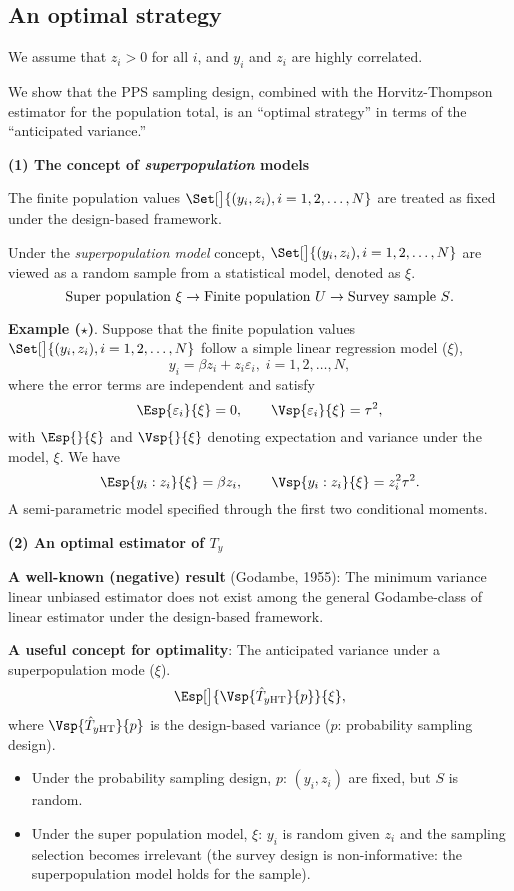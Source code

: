 \subsection{An optimal strategy}
We assume that $z_i > 0$ for all $i$, and $y_i$ and $z_i$ are highly correlated.

We show that the PPS sampling design, combined with the
Horvitz-Thompson estimator for the population total, is an ``optimal
strategy'' in terms of the ``anticipated variance.''

\textbf{(1) The concept of \emph{superpopulation} models}

The finite population values $ \Set[\big]{(y_i,z_i),i=1,2,\ldots,N} $ are treated as
fixed under the design-based framework.

Under the \emph{superpopulation model} concept, $ \Set[\big]{(y_i,z_i),i=1,2,\ldots,N} $
are viewed as a random sample from a statistical model, denoted as $ \xi $.
\[ \text{Super population $ \xi $}\rightarrow \text{Finite population $ U $}\rightarrow \text{Survey sample $ S $}. \]

\textbf{Example ($ \star $)}. Suppose that the finite population values $ \Set[\big]{(y_i,z_i),i=1,2,\ldots,N} $
follow a simple linear regression model ($ \xi $),
\[ y_i=\beta z_i+z_i\varepsilon_i,\; i=1,2,\ldots,N, \]
where the error terms are independent and satisfy
\[ \Esp{\varepsilon_i}{\xi}=0,\qquad \Vsp{\varepsilon_i}{\xi}=\tau^2, \]
with $ \Esp{}{\xi} $ and $ \Vsp{}{\xi} $ denoting expectation and variance
under the model, $ \xi $. We have
\[ \Esp{y_i\given z_i}{\xi}=\beta z_i,\qquad \Vsp{y_i\given z_i}{\xi}=z_i^2\tau^2. \]
A semi-parametric model specified through the first two conditional moments.

\textbf{(2) An optimal estimator of $T_y$}

\textbf{A well-known (negative) result} (Godambe, 1955): The minimum
variance linear unbiased estimator does not exist among the general
Godambe-class of linear estimator under the design-based framework.

\textbf{A useful concept for optimality}: The anticipated variance under a
superpopulation mode ($ \xi $).
\[ \Esp[\big]{\Vsp{\hat{T}_{y\HT}}{p}}{\xi}, \]
where $ \Vsp{\hat{T}_{y\HT}}{p} $ is the design-based variance ($ p $: probability
sampling design).
\begin{itemize}
      \item Under the probability sampling design, $ p $: $ (y_i,z_i) $ are
            fixed, but $ S $ is random.
      \item Under the super population model, $ \xi $: $ y_i $
            is random given $ z_i $ and the sampling selection becomes irrelevant (the survey
            design is non-informative: the superpopulation model holds for the
            sample).
\end{itemize}


